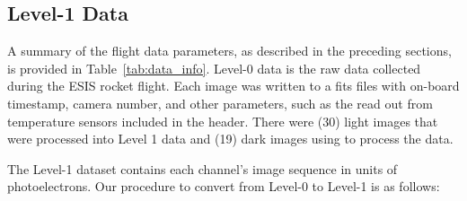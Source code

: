     
    \subsection{Level-1 Data}
	    
  
    
    	A summary of the flight data parameters, as described in the preceding sections, is provided in Table~\ref{tab:data_info}. Level-0 data is the raw data collected during the ESIS rocket flight.  
	    Each image was written to a fits files with on-board timestamp, camera number, and other parameters, such as the read out from temperature sensors included in the header.   There were (30) light images that were processed into Level 1 data and (19) dark images using to process the data.
	   
    	
    	
    	The Level-1 dataset contains each channel's image sequence in units of photoelectrons.
    	Our procedure to convert from Level-0 to Level-1 is as follows:
    	
